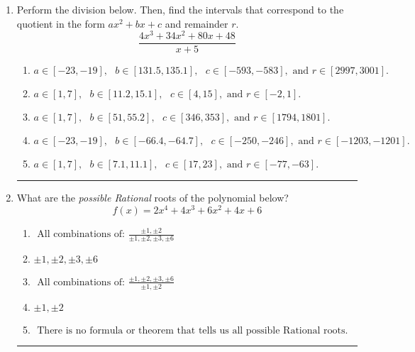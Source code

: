 \documentclass[14pt]{extbook}
\newcommand{\litem}[1]{\item#1\hspace*{-1cm}\rule{\textwidth}{0.4pt}}
\begin{document}
\begin{enumerate}
{\begin{enumerate}[label=\Alph*.]
\end{enumerate} }
\litem{
Perform the division below. Then, find the intervals that correspond to the quotient in the form $ax^2+bx+c$ and remainder $r$.\[ \frac{4x^{3} +34 x^{2} +80 x + 48}{x + 5} \]\begin{enumerate}[label=\Alph*.]
\item \( a \in [-23, -19], \text{   } b \in [131.5, 135.1], \text{   } c \in [-593, -583], \text{   and   } r \in [2997, 3001]. \)
\item \( a \in [1, 7], \text{   } b \in [11.2, 15.1], \text{   } c \in [4, 15], \text{   and   } r \in [-2, 1]. \)
\item \( a \in [1, 7], \text{   } b \in [51, 55.2], \text{   } c \in [346, 353], \text{   and   } r \in [1794, 1801]. \)
\item \( a \in [-23, -19], \text{   } b \in [-66.4, -64.7], \text{   } c \in [-250, -246], \text{   and   } r \in [-1203, -1201]. \)
\item \( a \in [1, 7], \text{   } b \in [7.1, 11.1], \text{   } c \in [17, 23], \text{   and   } r \in [-77, -63]. \)

\end{enumerate} }
\litem{
What are the \textit{possible Rational} roots of the polynomial below?\[ f(x) = 2x^{4} +4 x^{3} +6 x^{2} +4 x + 6 \]\begin{enumerate}[label=\Alph*.]
\item \( \text{ All combinations of: }\frac{\pm 1,\pm 2}{\pm 1,\pm 2,\pm 3,\pm 6} \)
\item \( \pm 1,\pm 2,\pm 3,\pm 6 \)
\item \( \text{ All combinations of: }\frac{\pm 1,\pm 2,\pm 3,\pm 6}{\pm 1,\pm 2} \)
\item \( \pm 1,\pm 2 \)
\item \( \text{ There is no formula or theorem that tells us all possible Rational roots.} \)


\end{enumerate}}
\end{enumerate}
\end{document}
